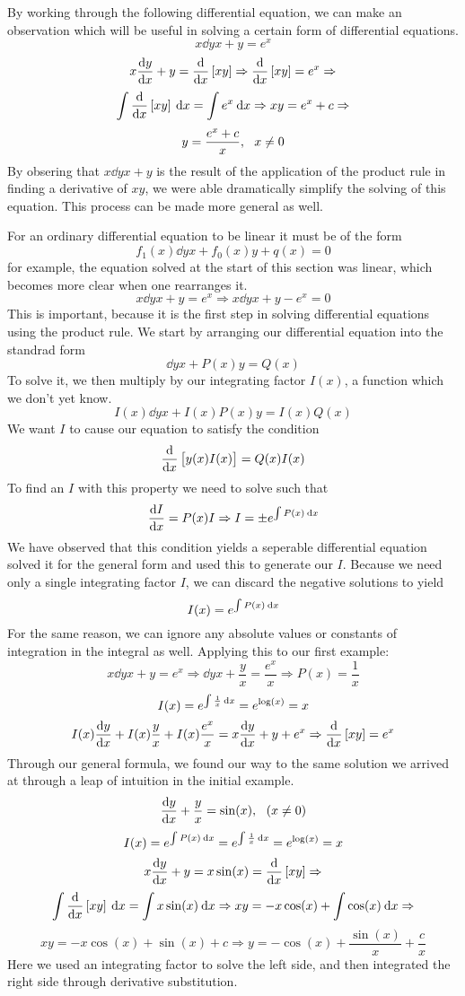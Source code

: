 \documentclass[12pt]{report}
\begin{document}
\begin{flushleft}
By working through the following differential equation, we can make an
observation which will be useful in solving a certain form of differential
equations.
\[x\dd{y}{x} + y = e^x\]
\[x\frac{\mathrm{d}y}{\mathrm{d}x} + y = \frac{\mathrm{d}}{\mathrm{d}x}\left[xy\right] \Rightarrow \frac{\mathrm{d}}{\mathrm{d}x}\left[xy\right] = e^x \Rightarrow\]
\[\int\frac{\mathrm{d}}{\mathrm{d}x}\left[xy\right]\:\mathrm{d}x = \int e^x\:\mathrm{d}x \Rightarrow xy = e^x + c \Rightarrow\]
\[y = \frac{e^x + c}{x}, \:\:\: x\neq0\]
By obsering that \(x\dd{y}{x} + y\) is the result of the application of the
product rule in finding a derivative of \(xy\), we were able dramatically
simplify the solving of this equation. This process can be made more general
as well. \par
For an ordinary differential equation to be linear it must be of the form
\[f_1(x)\dd{y}{x} + f_0(x)y + q(x) = 0\]
for example, the equation solved at the start of this section was linear,
which becomes more clear when one rearranges it. 
\[x\dd{y}{x} + y = e^x \Rightarrow x\dd{y}{x} + y - e^x = 0\]
This is important, because it is the first step in solving differential
equations using the product rule. We start by arranging our differential
equation into the standrad form
\[\dd{y}{x} + P(x)y = Q(x)\]
To solve it, we then multiply by our integrating factor \(I(x)\), a function
which we don't yet know.
\[I(x)\dd{y}{x} + I(x)P(x)y = I(x)Q(x)\]
We want \(I\) to cause our equation to satisfy the condition
\[\frac{\mathrm{d}}{\mathrm{d}x}\left[y(x)I(x)\right] = Q(x)I(x)\]
To find an \(I\) with this property we need to solve such that
\[\frac{\mathrm{d}I}{\mathrm{d}x} = P(x)I \Rightarrow I = \pm e^{\int P(x) \:\mathrm{d}x}\]
We have observed that this condition yields a seperable differential equation
solved it for the general form and used this to generate our \(I\). Because
we need only a single integrating factor \(I\), we can discard the negative
solutions to yield
\[I(x) = e^{\int P(x) \:\mathrm{d}x}\]
For the same reason, we can ignore any absolute values or constants of
integration in the integral as well. Applying this to our first example:
\[x\dd{y}{x} + y = e^x \Rightarrow \dd{y}{x} + \frac{y}{x} = \frac{e^x}{x}
\Rightarrow P(x) = \frac{1}{x}\]
\[I(x) = e^{\int \frac{1}{x} \:\mathrm{d}x} = e^{\log(x)} = x\]
\[I(x)\frac{\mathrm{d}y}{\mathrm{d}x} + I(x)\frac{y}{x} + I(x)\frac{e^x}{x} = x\frac{\mathrm{d}y}{\mathrm{d}x} + y + e^x
\Rightarrow \frac{\mathrm{d}}{\mathrm{d}x}\left[xy\right] = e^x\]
Through our general formula, we found our way to the same solution we arrived
at through a leap of intuition in the initial example.
\[\frac{\mathrm{d}y}{\mathrm{d}x} + \frac{y}{x} = \sin(x), \:\:\: (x\neq 0)\]
\[I(x) = e^{\int P(x) \:\mathrm{d}x} = e^{\int \frac{1}{x} \:\mathrm{d}x} = e^{\log(x)} = x\]
\[x\frac{\mathrm{d}y}{\mathrm{d}x} + y = x\sin(x) = \frac{\mathrm{d}}{\mathrm{d}x}\left[xy\right] \Rightarrow\]
\[\int \frac{\mathrm{d}}{\mathrm{d}x}\left[xy\right] \:\mathrm{d}x = \int x\sin(x) \:\mathrm{d}x \Rightarrow xy 
= -x\cos(x) + \int\cos(x) \:\mathrm{d}x \Rightarrow\]
\[xy = -x\cos(x) + \sin(x) + c \Rightarrow y 
= -\cos(x) + \frac{\sin(x)}{x} + \frac{c}{x}\]
Here we used an integrating factor to solve the left side, and then integrated
the right side through derivative substitution.


\end{flushleft}
\end{document}
